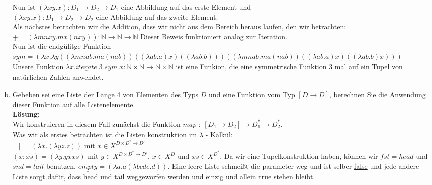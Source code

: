 \documentclass[11pt,a4paper,ngerman]{article}
\begin{document}
\begin{enumerate}[(a)]
      Nun ist $(\lambda xy.x) : D_1 \rightarrow D_2 \rightarrow D_1$ eine Abbildung auf das erste Element
      und \\$(\lambda xy.x) : D_1 \rightarrow D_2 \rightarrow D_2$ eine Abbildung auf das zweite Element.\\

      Als nächstes betrachten wir die Addition, dass wir nicht aus dem Bereich heraus laufen, den
      wir betrachten:
      $\underline{+} = (\lambda mnxy. m x (n x y)) : \mathbb{N} \rightarrow \mathbb{N} \rightarrow \mathbb{N}$
      Dieser Beweis funktioniert analog zur Iteration.\\

      Nun ist die endgülitge Funktion\\
      $\underline{sym} = (\lambda x. \lambda y ((\lambda mnab. m a (n a b)) ((\lambda ab.a)x) 
         ((\lambda ab.b))) ((\lambda mnab. m a (n a b)) ((\lambda ab.a)x) ((\lambda ab.b)x)))$\\

      Unsere Funktion $\lambda x.\underline{iterate} \; 3 \;  \underline{sym} \; x : \mathbb{N} \times \mathbb{N} 
      \rightarrow \mathbb{N} \times \mathbb{N}$ ist eine Funkion, die eine symmetrische Funktion
      3 mal auf ein Tupel von natürlichen Zahlen anwendet.
         

	\item Gebeben sei eine Liste der Länge 4 von Elementen des Typs $D$ und eine Funktion
      vom Typ $[D \rightarrow D]$, berechnen Sie die Anwendung dieser Funktion auf alle
      Listenelemente.\\
   \textbf{Lösung:}\\
      Wir konstruieren in diesem Fall zunächst die Funktion 
      $\underline{map} \; : \; [D_1 \rightarrow D_2] \rightarrow D_1^* \rightarrow D_2^*$.\\
      Was wir als erstes betrachten ist die Listen konstruktion im $\lambda$ - Kalkül:\\
      $[] = (\lambda x. (\lambda yz.z))$ mit $x\in X^{D \times D^* \rightarrow D'}$\\
      $(x:xs) = (\lambda y. y x xs)$ mit $y \in X^{D \times D^* \rightarrow D'}$, $x \in X^{D}$ 
      und $xs \in X^{D^*}$.
      Da wir eine Tupelkonstruktion haben, können wir $fst=head$ und $snd=tail$ benutzen.
      $\underline{empty} = (\lambda a.a (\lambda bcde.d))$. Eine leere Liste schmeißt die
      parameter weg und ist selber \underline{false} und jede andere Liste sorgt dafür, dass
      head und tail weggeworfen werden und einzig und allein true stehen bleibt.\\


\end{enumerate}
\end{document}
